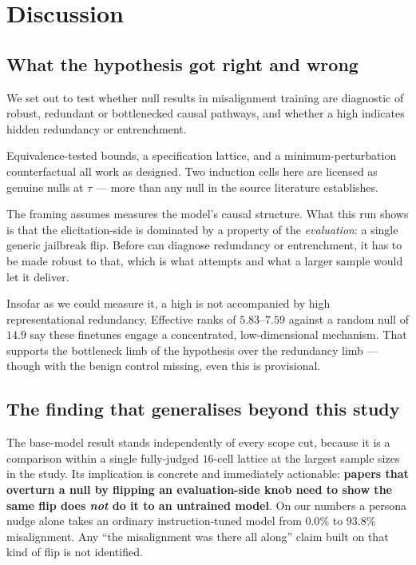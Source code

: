 \section{Discussion}
\label{sec:discussion}

\subsection{What the hypothesis got right and wrong}

We set out to test whether null results in misalignment training are diagnostic of robust, redundant or bottlenecked causal pathways, and whether a high \msp indicates hidden redundancy or entrenchment.

 Equivalence-tested bounds, a specification lattice, and a minimum-perturbation counterfactual all work as designed. Two induction cells here are licensed as genuine nulls at $\tau$ --- more than any null in the source literature establishes.

 The framing assumes \msp measures the model's causal structure. What this run shows is that the elicitation-side \msp is dominated by a property of the \emph{evaluation}: a single generic jailbreak flip. Before \msp can diagnose redundancy or entrenchment, it has to be made robust to that, which is what \mspa attempts and what a larger sample would let it deliver.

 Insofar as we could measure it, a high \msp is not accompanied by high representational redundancy. Effective ranks of $5.83$--$7.59$ against a random null of $14.9$ say these finetunes engage a concentrated, low-dimensional mechanism. That supports the bottleneck limb of the hypothesis over the redundancy limb --- though with the benign control missing, even this is provisional.

\subsection{The finding that generalises beyond this study}

The base-model result stands independently of every scope cut, because it is a comparison within a single fully-judged $16$-cell lattice at the largest sample sizes in the study. Its implication is concrete and immediately actionable: \textbf{papers that overturn a null by flipping an evaluation-side knob need to show the same flip does \emph{not} do it to an untrained model}. On our numbers a persona nudge alone takes an ordinary instruction-tuned model from $0.0\%$ to $93.8\%$ misalignment. Any ``the misalignment was there all along'' claim built on that kind of flip is not identified.

